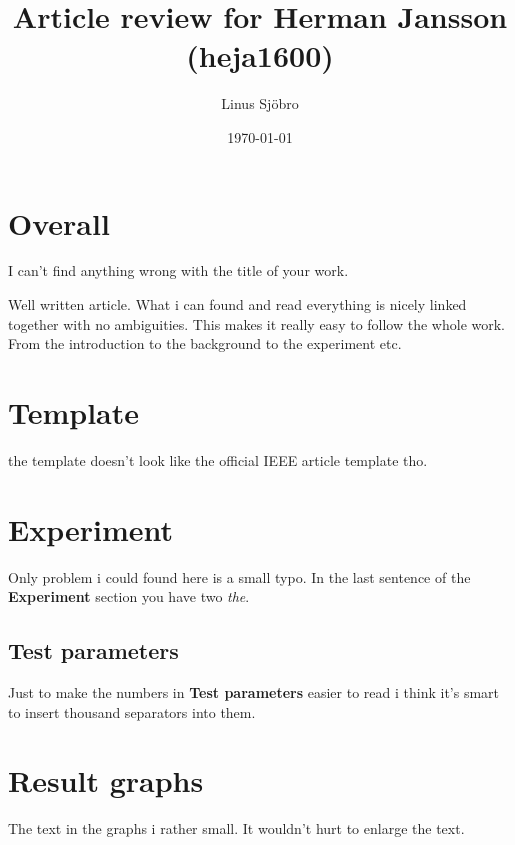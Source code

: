 \documentclass[12pt]{article}
\title{Article review for Herman Jansson (heja1600)}
\author{Linus Sjöbro}
\date{\today}
\begin{document}
\maketitle

\section{Overall} \label{}
I can't find anything wrong with the title of your work.

\bigskip


Well written article. What i can found and read everything is nicely linked together with no ambiguities. This makes it really easy to follow the whole work. From the introduction to the background to the experiment etc.

\section{Template} \label{}
the template doesn't look like the official IEEE article template tho.

\section{Experiment} \label{}
Only problem i could found here is a small typo. In the last sentence of the \textbf{Experiment} section you have two \textit{the}.

\subsection{Test parameters} \label{}
Just to make the numbers in \textbf{Test parameters} easier to read i think it's smart to insert thousand separators into them.

\section{Result graphs} \label{}
The text in the graphs i rather small. It wouldn't hurt to enlarge the text.
\end{document}
